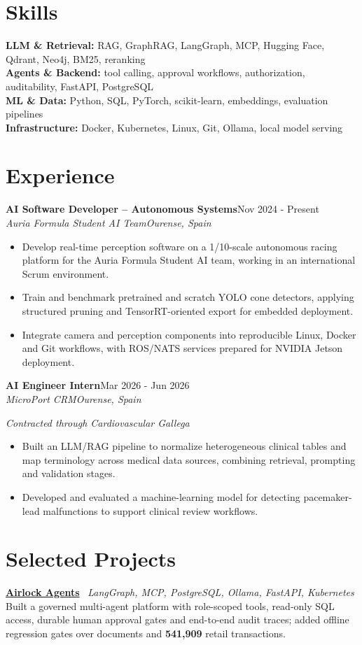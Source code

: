 \documentclass[10pt,a4paper]{article}
\newcommand{\entry}[4]{
  \textbf{#1}\hfill{\small #2}\\[-1pt]
  \textit{#3}\hfill{\small\textit{#4}}\par\vspace{-1.5pt}
}
\newcommand{\project}[3]{
  \textbf{#1} \textbar\ {\small\color{muted}\textit{#2}}\\[-1.5pt]
  #3\par\vspace{2pt}
}
\begin{document}
\section{Skills}
\textbf{LLM \& Retrieval:} RAG, GraphRAG, LangGraph, MCP, Hugging Face, Qdrant, Neo4j, BM25, reranking\\
\textbf{Agents \& Backend:} tool calling, approval workflows, authorization, auditability, FastAPI, PostgreSQL\\
\textbf{ML \& Data:} Python, SQL, PyTorch, scikit-learn, embeddings, evaluation pipelines\\
\textbf{Infrastructure:} Docker, Kubernetes, Linux, Git, Ollama, local model serving

\section{Experience}
\entry{AI Software Developer -- Autonomous Systems}{Nov 2024 - Present}{Auria Formula Student AI Team}{Ourense, Spain}
\begin{itemize}
  \item Develop real-time perception software on a 1/10-scale autonomous racing platform for the Auria Formula Student AI team, working in an international Scrum environment.
  \item Train and benchmark pretrained and scratch YOLO cone detectors, applying structured pruning and TensorRT-oriented export for embedded deployment.
  \item Integrate camera and perception components into reproducible Linux, Docker and Git workflows, with ROS/NATS services prepared for NVIDIA Jetson deployment.
\end{itemize}

\entry{AI Engineer Intern}{Mar 2026 - Jun 2026}{MicroPort CRM}{Ourense, Spain}
{\small\color{muted}\textit{Contracted through Cardiovascular Gallega}}\par\vspace{-1.5pt}
\begin{itemize}
  \item Built an LLM/RAG pipeline to normalize heterogeneous clinical tables and map terminology across medical data sources, combining retrieval, prompting and validation stages.
  \item Developed and evaluated a machine-learning model for detecting pacemaker-lead malfunctions to support clinical review workflows.
\end{itemize}

\section{Selected Projects}
\project{\href{https://lucasfiz.dev/en/projects/airlock-agents}{Airlock Agents}}{LangGraph, MCP, PostgreSQL, Ollama, FastAPI, Kubernetes}{Built a governed multi-agent platform with role-scoped tools, read-only SQL access, durable human approval gates and end-to-end audit traces; added offline regression gates over documents and \textbf{541,909} retail transactions.}
\end{document}
